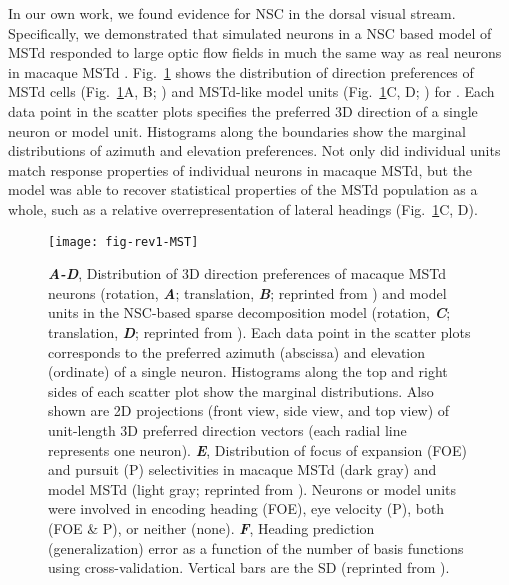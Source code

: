 In our own work, we found evidence for \ac{NSC} in the dorsal visual stream.
Specifically, we demonstrated that simulated neurons 
in a \ac{NSC} based model of \ac{MSTd} 
responded to  large optic flow fields in much the same way as real neurons in macaque \ac{MSTd} \cite{Beyeler2016}.
Fig.~\ref{fig:NMF|MSTd} shows the distribution of direction preferences
of \ac{MSTd} cells (Fig.~\ref{fig:NMF|MSTd}A, B; \cite{Takahashi2007})
and \ac{MSTd}-like model units (Fig.~\ref{fig:NMF|MSTd}C, D; \cite{Beyeler2016})
for .
Each data point in the scatter plots specifies the preferred 3D direction
of a single neuron or model unit.
Histograms along the boundaries show the marginal distributions of azimuth
and elevation preferences.
Not only did individual units match response properties of individual neurons
in macaque \ac{MSTd},
but the model was able to recover statistical properties of the \ac{MSTd}
population as a whole, such as a relative overrepresentation of lateral
headings (Fig.~\ref{fig:NMF|MSTd}C, D).

\begin{figure}[ht]
	\centering
	\texttt{[image: fig-rev1-MST]}
    \caption{
    \textbf{\emph{A-D}},
         Distribution of 3D direction preferences of macaque \ac{MSTd} neurons
         (rotation, \textbf{\emph{A}}; translation, \textbf{\emph{B}}; 
         reprinted  from \cite{Takahashi2007})
         and model units in the \ac{NSC}-based sparse decomposition model
         (rotation, \textbf{\emph{C}}; translation, \textbf{\emph{D}}; 
         reprinted  from \cite{Beyeler2016}).
         Each data point in the scatter plots corresponds to the preferred azimuth
         (abscissa) and elevation (ordinate) of a single neuron.
         Histograms along the top and right sides of each scatter plot show the
         marginal distributions.
         Also shown are 2D projections (front view, side view, and top view)
         of unit-length 3D preferred direction vectors (each radial line represents
         one neuron).
    \textbf{\emph{E}},
         Distribution of focus of expansion (FOE) and pursuit (P) selectivities
         in macaque \ac{MSTd} (dark gray) and model \ac{MSTd} (light gray;
         reprinted  from \cite{Beyeler2016}).
         Neurons or model units were involved in encoding heading (FOE),
         eye velocity (P), both (FOE \& P), or neither (none).
    \textbf{\emph{F}},
         Heading prediction (generalization) error as a function of the
         number of basis functions using cross-validation.
         Vertical bars are the SD (reprinted 
         from \cite{Beyeler2016}).
    }
	\label{fig:NMF|MSTd}
\end{figure}

